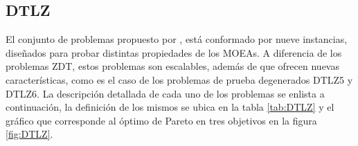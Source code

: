 \begin{table}[H]
\centering
\caption{Problemas ZDT}
\label{tab:ZDT}
\end{table}

\subsection{DTLZ}
El conjunto de problemas propuesto por \cite{Joel:DTLZ_1, Joel:DTLZ_2}, está conformado por nueve instancias, diseñados para probar distintas propiedades de los MOEAs.
%
A diferencia de los problemas ZDT, estos problemas son escalables, además de que ofrecen nuevas características, como es  el caso de los problemas de prueba degenerados DTLZ5 y DTLZ6.
%
La descripción detallada de cada uno de los problemas se enlista a continuación, la definición de los mismos se ubica en la tabla \ref{tab:DTLZ} y el gráfico que corresponde al óptimo de Pareto en tres objetivos en la figura \ref{fig:DTLZ}.


